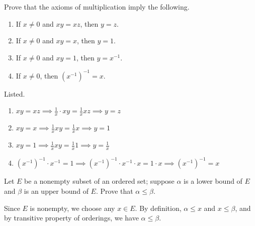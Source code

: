   \begin{exercise}[Rudin 1.3]
    Prove that the axioms of multiplication imply the following. 
    \begin{enumerate}
      \item If $x \neq 0$ and $xy = xz$, then $y = z$. 
      \item If $x \neq 0$ and $xy = x$, then $y = 1$. 
      \item If $x \neq 0$ and $xy = 1$, then $y = x^{-1}$. 
      \item If $x \neq 0$, then $(x^{-1})^{-1} = x$. 
    \end{enumerate}
  \end{exercise}
  \begin{solution}
    Listed. 
    \begin{enumerate}
      \item $xy = xz \implies \frac{1}{x} \cdot x y = \frac{1}{x} x z \implies y = z$ 
      \item $x y = x \implies \frac{1}{x} x y = \frac{1}{x} x \implies y = 1$ 
      \item $x y = 1 \implies \frac{1}{x} x y = \frac{1}{x} 1 \implies y = \frac{1}{x}$ 
      \item $(x^{-1})^{-1} \cdot x^{-1} = 1 \implies (x^{-1})^{-1} \cdot x^{-1} \cdot x = 1 \cdot x \implies (x^{-1})^{-1} = x$
    \end{enumerate}
  \end{solution}

  \begin{exercise}[Rudin 1.4]
    Let $E$ be a nonempty subset of an ordered set; suppose $\alpha$ is a lower bound of $E$ and $\beta$ is an upper bound of $E$. Prove that $\alpha \leq \beta$. 
  \end{exercise}
  \begin{solution}
    Since $E$ is nonempty, we choose any $x \in E$. By definition, $\alpha \leq x$ and $x \leq \beta$, and by transitive property of orderings, we have $\alpha \leq \beta$. 
  \end{solution}

